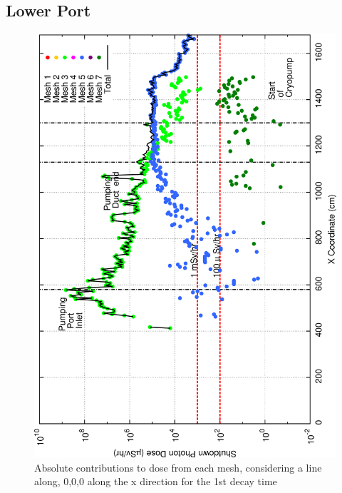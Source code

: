 \documentclass[12pt]{article}
\begin{document}
\subsection*{Lower Port}
\begin{figure}[ht!]
\centering
\includegraphics[clip,scale=0.25]{../plots/crosstalk/b4c/lp/dc1.png}
\caption{Absolute contributions to dose from each mesh, considering a line along, 0,0,0 along the x direction for the 1st decay time}
\label{fig:b4c_ct_lp_dc1}
\end{figure}
\end{document}
